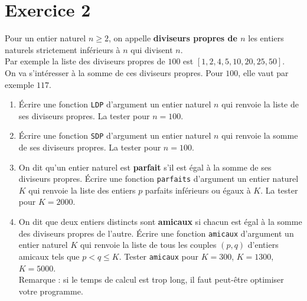 \section*{Exercice 2}
Pour un entier naturel $n\geq 2$, on appelle \textbf{diviseurs propres de $n$} les entiers naturels strictement inférieurs à $n$ qui divisent $n$. \\
Par exemple la liste des diviseurs propres de $100$ est $[1,2,4,5,10,20,25,50]$.\\
On va s'intéresser à la somme de ces diviseurs propres. Pour $100$, elle vaut par exemple $117$.
\begin{enumerate}
\item \'Ecrire une fonction \texttt{LDP} d'argument un entier naturel $n$ qui renvoie la liste de ses diviseurs propres. La tester pour $n=100$.
\item \'Ecrire une fonction \texttt{SDP} d'argument un entier naturel $n$ qui renvoie la somme de ses diviseurs propres. La tester pour $n=100$.
\item On dit qu'un entier naturel est \textbf{parfait} s'il est égal à la somme de ses diviseurs propres. \'Ecrire une fonction \texttt{parfaits} d'argument un entier naturel $K$ qui renvoie la liste des entiers $p$ parfaits inférieurs ou égaux à $K$. La tester pour $K=2000$.
\item On dit que deux entiers distincts sont \textbf{amicaux} si chacun est égal à la somme des diviseurs propres de l'autre. \'Ecrire une fonction \texttt{amicaux} d'argument un entier naturel $K$ qui renvoie la liste de tous les couples $(p,q)$ d'entiers amicaux tels que $p<q \leq K$. Tester \texttt{amicaux} pour $K=300$, $K=1300$, $K=5000$.\\
Remarque : si le temps de calcul est trop long, il faut peut-être optimiser votre programme. %
\end{enumerate}




